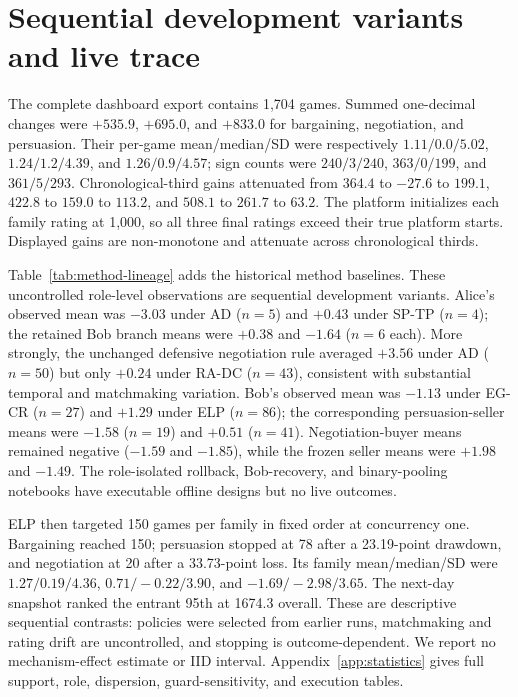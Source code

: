 \section{Sequential development variants and live trace}

The complete dashboard export contains 1,704 games. Summed one-decimal changes
were $+535.9$, $+695.0$, and $+833.0$ for bargaining, negotiation, and
persuasion. Their per-game mean/median/SD were respectively
$1.11/0.0/5.02$, $1.24/1.2/4.39$, and $1.26/0.9/4.57$; sign counts were
$240/3/240$, $363/0/199$, and $361/5/293$. Chronological-third gains
attenuated from $364.4$ to $-27.6$ to $199.1$, $422.8$ to $159.0$ to
$113.2$, and $508.1$ to $261.7$ to $63.2$. The platform initializes each
family rating at 1,000, so all three final ratings exceed their true platform
starts. Displayed gains are non-monotone and attenuate across chronological
thirds.

Table~\ref{tab:method-lineage} adds the historical method baselines. These
uncontrolled role-level observations are sequential development variants.
Alice's observed mean was $-3.03$ under AD ($n=5$) and $+0.43$ under SP-TP
($n=4$); the retained Bob branch means were $+0.38$ and $-1.64$ ($n=6$ each).
More strongly, the unchanged defensive negotiation rule averaged $+3.56$
under AD ($n=50$) but only $+0.24$ under RA-DC ($n=43$), consistent with
substantial temporal and matchmaking variation. Bob's observed mean was
$-1.13$ under EG-CR ($n=27$) and $+1.29$ under ELP ($n=86$); the corresponding
persuasion-seller means were $-1.58$ ($n=19$) and $+0.51$ ($n=41$).
Negotiation-buyer means remained negative ($-1.59$ and $-1.85$), while the
frozen seller means were $+1.98$ and $-1.49$. The role-isolated rollback,
Bob-recovery, and binary-pooling notebooks have executable offline designs
but no live outcomes.

ELP then targeted 150 games per family in fixed order at concurrency one.
Bargaining reached 150; persuasion stopped at 78 after a 23.19-point
drawdown, and negotiation at 20 after a 33.73-point loss. Its family
mean/median/SD were $1.27/0.19/4.36$, $0.71/-0.22/3.90$, and
$-1.69/-2.98/3.65$. The next-day snapshot ranked the entrant 95th at
1674.3 overall. These are descriptive sequential contrasts: policies were
selected from earlier runs, matchmaking and rating drift are uncontrolled,
and stopping is outcome-dependent. We report no mechanism-effect estimate
or IID interval. Appendix~\ref{app:statistics} gives full support, role,
dispersion, guard-sensitivity, and execution tables.
